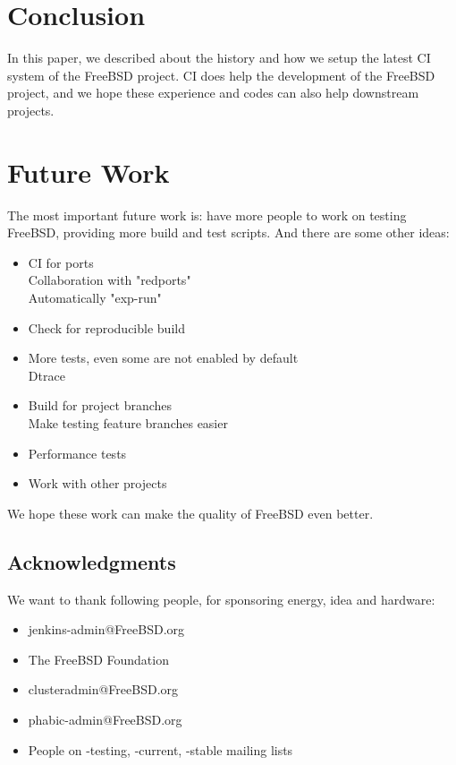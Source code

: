 \documentclass[a4paper,twocolumn,10pt]{article}
\begin{document}
\section{Conclusion}

In this paper, we described about the history and how we setup the latest CI
system of the FreeBSD project.  CI does help the development of the FreeBSD
project, and we hope these experience and codes can also help downstream
projects.

\section{Future Work}

The most important future work is: have more people to work on testing FreeBSD,
providing more build and test scripts. And there are some other ideas:

\begin{itemize}
\item CI for ports\\
  Collaboration with "redports"\\
  Automatically "exp-run"
\item Check for reproducible build
\item More tests, even some are not enabled by default\\
Dtrace
\item Build for project branches\\
Make testing feature branches easier
\item Performance tests
\item Work with other projects
\end{itemize}

We hope these work can make the quality of FreeBSD even better.

\subsection*{Acknowledgments}

We want to thank following people, for sponsoring energy, idea and hardware:

\begin{itemize}
\item jenkins-admin@FreeBSD.org
\item The FreeBSD Foundation
\item clusteradmin@FreeBSD.org
\item phabic-admin@FreeBSD.org
\item People on -testing, -current, -stable mailing lists
\end{itemize}

{\footnotesize 
}
\end{document}

